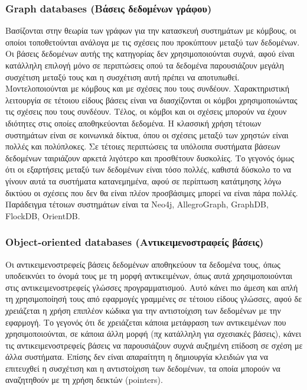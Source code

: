 		\subsubsection{Graph databases (Βάσεις δεδομένων γράφου)}
		Βασίζονται στην θεωρία των γράφων για την κατασκευή συστημάτων με κόμβους, οι οποίοι τοποθετούνται ανάλογα με τις σχέσεις που προκύπτουν μεταξύ των δεδομένων. Οι βάσεις δεδομένων αυτής της κατηγορίας δεν χρησιμοποιούνται συχνά, αφού είναι κατάλληλη επιλογή μόνο σε περιπτώσεις οπού τα δεδομένα παρουσιάζουν μεγάλη συσχέτιση μεταξύ τους και η συσχέτιση αυτή πρέπει να αποτυπωθεί. Μοντελοποιούνται με κόμβους και με σχέσεις που τους συνδέουν. Χαρακτηριστική λειτουργία σε τέτοιου είδους βάσεις είναι να διασχίζονται οι κόμβοι χρησιμοποιώντας τις σχέσεις που τους συνδέουν. Τέλος, οι κόμβοι και οι σχέσεις μπορούν να έχουν ιδιότητες στις οποίες αποθηκεύονται δεδομένα. Η κλασσική χρήση τέτοιων συστημάτων είναι σε κοινωνικά δίκτυα, όπου οι σχέσεις μεταξύ των χρηστών είναι πολλές και πολύπλοκες. Σε τέτοιες περιπτώσεις τα υπόλοιπα συστήματα βάσεων δεδομένων ταιριάζουν αρκετά λιγότερο και προσθέτουν δυσκολίες. Το γεγονός όμως ότι οι εξαρτήσεις μεταξύ των δεδομένων είναι τόσο πολλές, καθιστά δύσκολο το να γίνουν αυτά τα συστήματα κατανεμημένα, αφού σε περίπτωση κατάτμησης λόγω δικτύου οι σχέσεις που δεν θα είναι πλέον προσβάσιμες μπορεί να είναι πάρα πολλές. Παράδειγμα τέτοιων συστημάτων είναι τα Neo4j, AllegroGraph, GraphDB, FlockDB, OrientDB\cite{he2008graphs}\cite{robinson2013graph}.
		
		\subsubsection{Object-oriented databases (Αντικειμενοστραφείς βάσεις)}
		Οι αντικειμενοστρεφείς βάσεις δεδομένων αποθηκεύουν τα δεδομένα τους, όπως υποδεικνύει το όνομά τους με τη μορφή αντικειμένων, όπως αυτά χρησιμοποιούνται στις αντικειμενοστρεφείς γλώσσες προγραμματισμού. Αυτό κάνει πιο άμεση και απλή τη χρησιμοποίησή τους από εφαρμογές γραμμένες σε τέτοιου είδους γλώσσες, αφού δε χρειάζεται η χρήση επιπλέον κώδικα για την αντιστοίχιση των δεδομένων με την εφαρμογή. Το γεγονός ότι δε χρειάζεται κάποια μετάφραση των αντικειμένων που χρησιμοποιούνται, σε κάποια άλλη μορφή (πχ κατάλληλη για σχεσιακές βάσεις), κάνει τις αντικειμενοστρεφείς βάσεις να παρουσιάζουν συχνά αυξημένη επίδοση σε σχέση με άλλα συστήματα. Επίσης δεν είναι απαραίτητη η δημιουργία κλειδιών για να επιτευχθεί η συσχέτιση και η αντιστοίχιση των δεδομένων, τα οποία μπορούν να αναζητηθούν με τη χρήση δεικτών (pointers).
		
